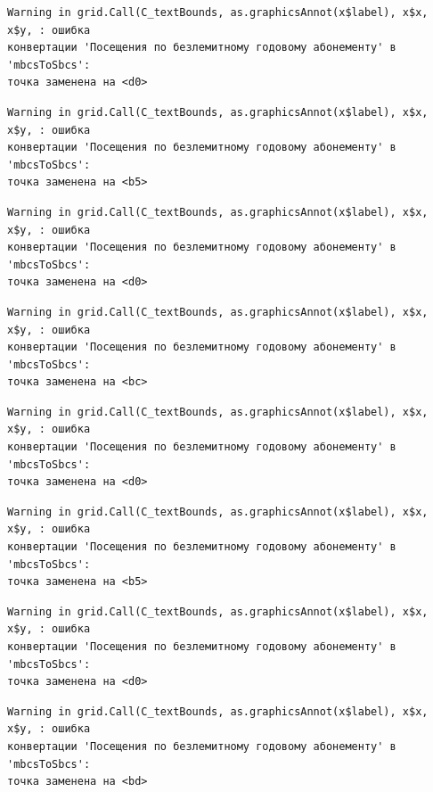 \documentclass[
  letterpaper,
  DIV=11,
  numbers=noendperiod]{scrreprt}
\begin{document}
\begin{verbatim}
Warning in grid.Call(C_textBounds, as.graphicsAnnot(x$label), x$x, x$y, : ошибка
конвертации 'Посещения по безлемитному годовому абонементу' в 'mbcsToSbcs':
точка заменена на <d0>
\end{verbatim}

\begin{verbatim}
Warning in grid.Call(C_textBounds, as.graphicsAnnot(x$label), x$x, x$y, : ошибка
конвертации 'Посещения по безлемитному годовому абонементу' в 'mbcsToSbcs':
точка заменена на <b5>
\end{verbatim}

\begin{verbatim}
Warning in grid.Call(C_textBounds, as.graphicsAnnot(x$label), x$x, x$y, : ошибка
конвертации 'Посещения по безлемитному годовому абонементу' в 'mbcsToSbcs':
точка заменена на <d0>
\end{verbatim}

\begin{verbatim}
Warning in grid.Call(C_textBounds, as.graphicsAnnot(x$label), x$x, x$y, : ошибка
конвертации 'Посещения по безлемитному годовому абонементу' в 'mbcsToSbcs':
точка заменена на <bc>
\end{verbatim}

\begin{verbatim}
Warning in grid.Call(C_textBounds, as.graphicsAnnot(x$label), x$x, x$y, : ошибка
конвертации 'Посещения по безлемитному годовому абонементу' в 'mbcsToSbcs':
точка заменена на <d0>
\end{verbatim}

\begin{verbatim}
Warning in grid.Call(C_textBounds, as.graphicsAnnot(x$label), x$x, x$y, : ошибка
конвертации 'Посещения по безлемитному годовому абонементу' в 'mbcsToSbcs':
точка заменена на <b5>
\end{verbatim}

\begin{verbatim}
Warning in grid.Call(C_textBounds, as.graphicsAnnot(x$label), x$x, x$y, : ошибка
конвертации 'Посещения по безлемитному годовому абонементу' в 'mbcsToSbcs':
точка заменена на <d0>
\end{verbatim}

\begin{verbatim}
Warning in grid.Call(C_textBounds, as.graphicsAnnot(x$label), x$x, x$y, : ошибка
конвертации 'Посещения по безлемитному годовому абонементу' в 'mbcsToSbcs':
точка заменена на <bd>
\end{verbatim}
\end{document}
